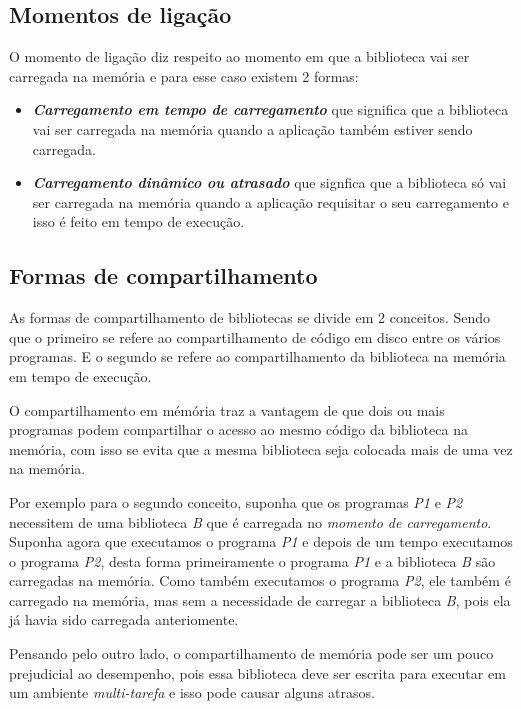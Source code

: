\subsection{Momentos de ligação}
\label{subsection:momentos_de_ligação}

O momento de ligação diz respeito ao momento em que a biblioteca vai ser carregada na memória e 
para esse caso existem 2 formas:

\begin{itemize}

 \item \emph{\textbf{Carregamento em tempo de carregamento}} que significa que a biblioteca vai ser 
 carregada na memória quando a aplicação também estiver sendo carregada.
 
 \item \emph{\textbf{Carregamento dinâmico ou atrasado}} que signfica que a biblioteca só vai ser carregada na 
 memória quando a aplicação requisitar o seu carregamento e isso é feito em tempo de execução.
 
\end{itemize}

\subsection{Formas de compartilhamento}
\label{subsection:formas_de_compartilhamento}

As formas de compartilhamento de bibliotecas se divide em 2 conceitos. Sendo que o primeiro se refere 
ao compartilhamento de código em disco entre os vários programas. E o segundo se refere ao 
compartilhamento da biblioteca na memória em tempo de execução. 

O compartilhamento em mémória traz a vantagem de que dois ou mais programas podem 
compartilhar o acesso ao mesmo código da biblioteca na memória, com isso se evita que a mesma 
biblioteca seja colocada mais de uma vez na memória. 

Por exemplo para o segundo conceito, suponha que os programas \emph{P1} e \emph{P2} necessitem de 
uma biblioteca \emph{B} que é carregada no \emph{momento de carregamento}. Suponha 
agora que executamos o programa \emph{P1} e depois de um tempo executamos o programa \emph{P2}, desta 
forma primeiramente o programa \emph{P1} e a biblioteca \emph{B} são carregadas na memória. Como 
também executamos o programa \emph{P2}, ele também é carregado na memória, mas sem a necessidade de 
carregar a biblioteca \emph{B}, pois ela já havia sido carregada anteriomente.

Pensando pelo outro lado, o compartilhamento de memória pode ser um pouco prejudicial 
ao desempenho, pois essa biblioteca deve ser escrita para executar em um ambiente \emph{multi-tarefa} 
e isso pode causar alguns atrasos.